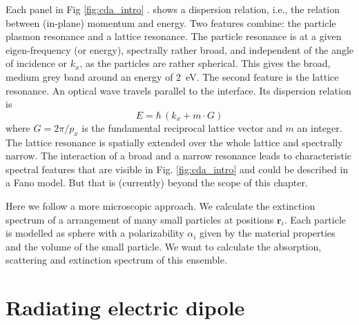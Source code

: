 Each panel in Fig \ref{fig:cda_intro} . shows a dispersion relation, i.e., the relation between (in-plane) momentum and energy. Two features combine: the particle plasmon resonance and a lattice resonance. The particle resonance is at a given eigen-frequency (or energy), spectrally rather broad, and independent of the angle of incidence or $k_x$, as the particles are rather spherical. This gives the broad, medium grey band around an energy of 2~eV. The second feature is the lattice resonance.  An optical wave travels parallel to the interface. Its dispersion relation is
\begin{equation}
 E =   \hbar  \, \left(  k_x + m \cdot G \right)
\end{equation}
where $G = 2 \pi / p_x$ is the fundamental reciprocal lattice vector and $m$ an integer. The lattice resonance is spatially extended over the whole lattice and spectrally narrow. The interaction of a broad and a narrow resonance leads to characteristic spectral features that are visible in Fig. \ref{fig:cda_intro}  and could be described in a Fano model. But that is (currently) beyond the scope of this chapter.

Here we follow a more microscopic approach. We calculate the extinction spectrum of a  arrangement of  many small particles at positions $\mathbf{r}_i$.
Each  particle is modelled as sphere  with a  polarizability $\alpha_i$ given by the material properties and the volume of the small particle. We want to calculate the absorption, scattering and extinction spectrum of this  ensemble.


\section{Radiating electric dipole}

